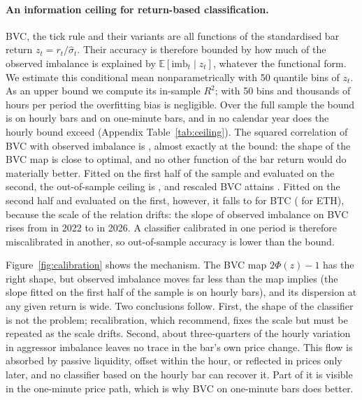 \paragraph{An information ceiling for return-based classification.} BVC, the tick rule and their
variants are all functions of the standardised bar return $z_t=r_t/\hat\sigma_t$. Their accuracy is
therefore bounded by how much of the observed imbalance is explained by $\mathbb E[\text{imb}_t\mid
z_t]$, whatever the functional form. We estimate this conditional mean nonparametrically with 50
quantile bins of $z_t$. As an upper bound we compute its in-sample $R^2$; with 50 bins and
thousands of hours per period the overfitting bias is negligible. Over the full sample the bound is
\BTCceilIS{} on hourly bars and \BTCceilISm{} on one-minute bars, and in no calendar year does the
hourly bound exceed \BTCceilISmax{} (Appendix Table~\ref{tab:ceiling}). The squared correlation of
BVC with observed imbalance is \BTCcorrsqBVC, almost exactly at the bound: the shape of the BVC map
is close to optimal, and no other function of the bar return would do materially better. Fitted on
the first half of the sample and evaluated on the second, the out-of-sample ceiling is \BTCceilH, and
rescaled BVC attains \BTCbvcResH. Fitted on the second half and evaluated on the first, however, it falls to
\BTCceilRev{} for BTC (\ETHceilRev{} for ETH), because the scale of the relation drifts: the slope
of observed imbalance on BVC rises from \BTCslopeFirst{} in 2022 to \BTCslopeLast{} in 2026. A
classifier calibrated in one period is therefore miscalibrated in another, so out-of-sample
accuracy is lower than the bound.

Figure~\ref{fig:calibration} shows the mechanism. The BVC map $2\Phi(z)-1$ has the right shape, but
observed imbalance moves far less than the map implies (the slope fitted on the first half of the
sample is \BTCslopeH{} on hourly bars), and its dispersion at any given return is wide. Two conclusions follow. First, the shape of
the classifier is not the problem; recalibration, which \citet{panayides2019} recommend, fixes the
scale but must be repeated as the scale drifts. Second, about three-quarters of the hourly variation
in aggressor imbalance leaves no trace in the bar's own price change. This flow is absorbed by
passive liquidity, offset within the hour, or reflected in prices only later, and no classifier
based on the hourly bar can recover it. Part of it is visible in the one-minute price path, which is
why BVC on one-minute bars does better.

